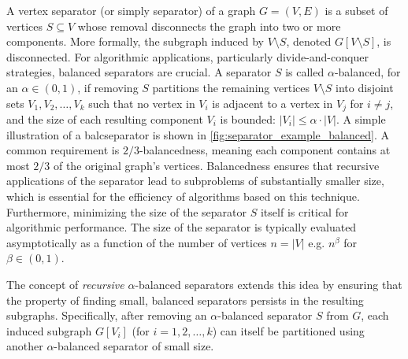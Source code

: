 A vertex separator (or simply separator) of a graph \(G = (V, E)\) is a subset of vertices \(S \subseteq V\) whose removal disconnects the graph into two or more components.
More formally, the subgraph induced by \(V \setminus S\), denoted \(G[V \setminus S]\), is disconnected.
For algorithmic applications, particularly divide-and-conquer strategies, balanced separators are crucial.
A separator \(S\) is called \(\alpha\)-balanced, for an \(\alpha \in (0,1)\), if removing \(S\) partitions the remaining vertices \(V \setminus S\) into disjoint sets \(V_1, V_2, \dots, V_k\) such that no vertex in \(V_i\) is adjacent to a vertex in \(V_j\) for \(i \neq j\), and the size of each resulting component \(V_i\) is bounded: \(|V_i| \le \alpha \cdot |V|\).
A simple illustration of a balcseparator is shown in \cref{fig:separator_example_balanced}.
A common requirement is \(2/3\)-balancedness, meaning each component contains at most \(2/3\) of the original graph's vertices.
Balancedness ensures that recursive applications of the separator lead to subproblems of substantially smaller size, which is essential for the efficiency of algorithms based on this technique.
Furthermore, minimizing the size of the separator \(S\) itself is critical for algorithmic performance.
The size of the separator is typically evaluated asymptotically as a function of the number of vertices \(n = |V|\) e.g. \(n^\beta\) for \(\beta \in (0,1)\).

The concept of \emph{recursive} \(\alpha\)-balanced separators extends this idea by ensuring that the property of finding small, balanced separators persists in the resulting subgraphs.
Specifically, after removing an \(\alpha\)-balanced separator \(S\) from \(G\), each induced subgraph \(G[V_i]\) (for \(i = 1, 2, \dots, k\)) can itself be partitioned using another \(\alpha\)-balanced separator of small size.

